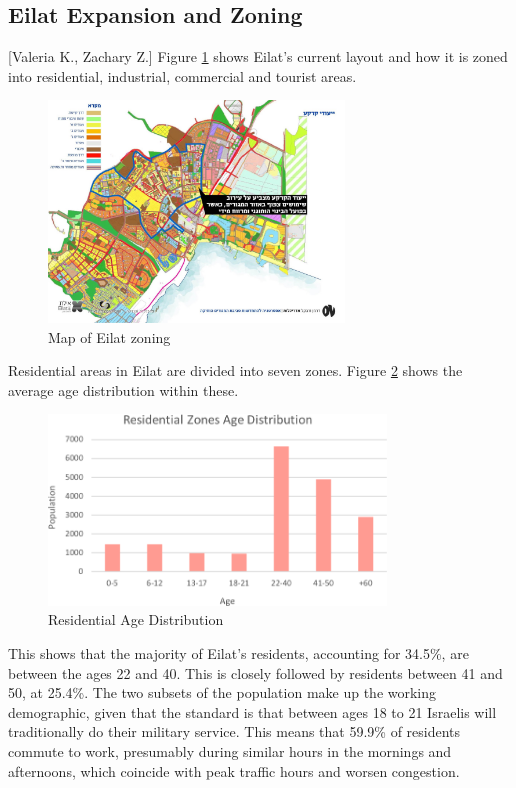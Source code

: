 \documentclass[12pt]{article}                               %
\begin{document}
\subsection{Eilat Expansion and Zoning}[Valeria K., Zachary Z.]
Figure \ref{img:eilat_zoning} shows Eilat's current layout and how it is zoned into residential, industrial, commercial and tourist areas. 

\begin{figure}[H]
    \centering
    \includegraphics[width=0.7\textwidth]{images/eilat_zoning.jpg}
    \caption{Map of Eilat zoning}
    \label{img:eilat_zoning}
\end{figure}

Residential areas in Eilat are divided into seven zones. Figure \ref{img:Residential_Age_Distribution} shows the average age distribution within these. 

\begin{figure}[H]
    \centering
    \includegraphics[width=0.8\textwidth]{images/resident_age_distribution.png}
    \caption{Residential Age Distribution}
    \label{img:Residential_Age_Distribution}
\end{figure}

This shows that the majority of Eilat's residents, accounting for 34.5\%, are between the ages 22 and 40. This is closely followed by residents between 41 and 50, at 25.4\%. The two subsets of the population make up the working demographic, given that the standard is that between ages 18 to 21 Israelis will traditionally do their military service. This means that 59.9\% of residents commute to work, presumably during similar hours in the mornings and afternoons, which coincide with peak traffic hours and worsen congestion.
\end{document}

